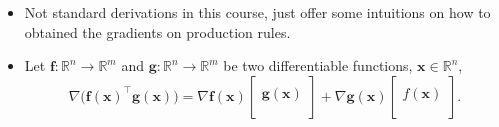 \documentclass[12pt,thmsa]{article}
\begin{document}
\begin{itemize}
	\item Not standard derivations in this course, just offer some intuitions on how to obtained the gradients on production rules.
	
	\item Let \(\boldsymbol{f}: \mathbb{R}^{n} \rightarrow \mathbb{R}^{m}\) and \(\boldsymbol{g}: \mathbb{R}^{n} \rightarrow \mathbb{R}^{m}\) be two differentiable functions, \(\boldsymbol{x} \in \mathbb{R}^{n}\),
	\[ 	\nabla \bigg (\boldsymbol{f}(\boldsymbol{x})^{\top} \boldsymbol{g}(\boldsymbol{x}) \bigg )
	 = \nabla \boldsymbol{f}(\boldsymbol{x}) \left[\begin{array}{c}\\  \boldsymbol{g}(\boldsymbol{x}) \\  \\ \end{array} \right] 
	+ \nabla\boldsymbol{g} (\boldsymbol{x}) \left[\begin{array}{c}\\  f(\boldsymbol{x}) \\  \\ \end{array} \right]. \]
	

\end{itemize}
\end{document}
